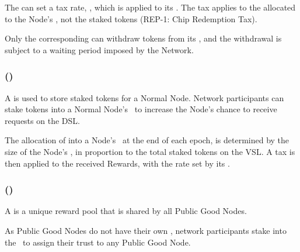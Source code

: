 The  can set a tax rate, \tax, which is applied to its \stakingPool.
The tax applies to the  allocated to the Node's \stakingPool, not the staked tokens (REP-1: Chip Redemption Tax).

Only the corresponding  can withdraw tokens from its \operationPool, and the withdrawal is subject to a waiting period imposed by the Network.

\subsubsection{ (\stakingPool)}
\label{subsubsec:staking_pool}

A  is used to store staked tokens for a Normal Node. Network participants can stake tokens into a Normal Node's \stakingPool\ to increase the Node's chance to receive requests on the \gls{DSL}.

The allocation of  into a Node's \stakingPool\ at the end of each epoch, is determined by the size of the Node's \stakingPool, in proportion to the total staked tokens on the \gls{VSL}.
A tax is then applied to the received Rewards, with the rate set by its .

\subsubsection{ (\publicGoodPool)}

A  is a unique reward pool that is shared by all Public Good Nodes.

As Public Good Nodes do not have their own \stakingPool, network participants stake into the \publicGoodPool\ to assign their trust to any Public Good Node.
